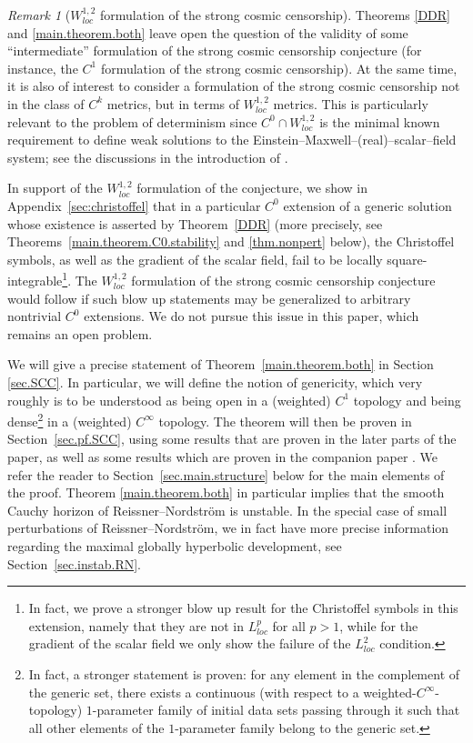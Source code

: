 \documentclass[10pt, reqno]{amsart}
\theoremstyle{definition}
\theoremstyle{remark}
\newtheorem{remark}[theorem]{Remark}
\numberwithin{equation}{section}
\newcommand{\0}{\emptyset}
\begin{document}
\begin{remark}[$W^{1,2}_{loc}$ formulation of the strong cosmic censorship]
Theorems \ref{DDR} and \ref{main.theorem.both} leave open the question of the validity of some ``intermediate'' formulation of the strong cosmic censorship conjecture (for instance, the $C^1$ formulation of the strong cosmic censorship). At the same time, it is also of interest to consider a formulation of the strong cosmic censorship not in the class of $C^k$ metrics, but in terms of $W^{1,2}_{loc}$ metrics. This is particularly relevant to the problem of determinism since $C^0\cap W^{1,2}_{loc}$ is the minimal known requirement to define weak solutions to the Einstein--Maxwell--(real)--scalar--field system; see the discussions in the introduction of \cite{Chr}. 

In support of the $W^{1,2}_{loc}$ formulation of the conjecture, we show in Appendix~\ref{sec:christoffel} that in a particular $C^{0}$ extension of a generic solution whose existence is asserted by Theorem~\ref{DDR} (more precisely, see Theorems~\ref{main.theorem.C0.stability} and \ref{thm.nonpert} below), the Christoffel symbols, as well as the gradient of the scalar field, fail to be locally square-integrable\footnote{In fact, we prove a stronger blow up result for the Christoffel symbols in this extension, namely that they are not in $L^{p}_{loc}$ for all $p>1$, while for the gradient of the scalar field we only show the failure of the $L^{2}_{loc}$ condition.}. The $W^{1,2}_{loc}$ formulation of the strong cosmic censorship conjecture would follow if such blow up statements may be generalized to arbitrary nontrivial $C^{0}$ extensions. We do not pursue this issue in this paper, which remains an open problem.
\end{remark}


We will give a precise statement of Theorem~\ref{main.theorem.both} in Section \ref{sec.SCC}. In particular, we will define the notion of genericity, which very roughly is to be understood as being open in a (weighted) $C^1$ topology and being dense\footnote{In fact, a stronger statement is proven: for any element in the complement of the generic set, there exists a continuous (with respect to a weighted-$C^\infty$-topology) $1$-parameter family of initial data sets passing through it such that all other elements of the $1$-parameter family belong to the generic set.} in a (weighted) $C^\infty$ topology. The theorem will then be proven in Section~\ref{sec.pf.SCC}, using some results that are proven in the later parts of the paper, as well as some results which are proven in the companion paper \cite{LO.exterior}. We refer the reader to Section~\ref{sec.main.structure} below for the main elements of the proof. Theorem \ref{main.theorem.both} in particular implies that the smooth Cauchy horizon of Reissner--Nordstr\"om is unstable. In the special case of small perturbations of Reissner--Nordstr\"om, we in fact have more precise information regarding the maximal globally hyperbolic development, see Section~\ref{sec.instab.RN}.
\end{document}
